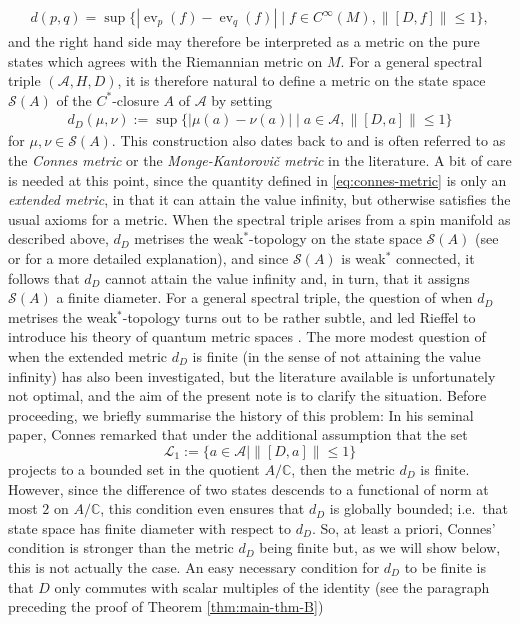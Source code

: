 \documentclass[12pt,a4paper,twoside,reqno]{amsart}
\theoremstyle{plain}
\theoremstyle{definition}
\theoremstyle{remark} %
\theoremstyle{plain}
\numberwithin{equation}{section}
\newcommand{\ev}{{\operatorname{ev}}}
\renewcommand{\leq}{\leqslant}
\newcommand{\C}[1]{\mathcal{#1}}
\newcommand{\A}{{\mathcal{A}}}
\renewcommand{\S}{{\mathcal{S}}}
\begin{document}
\begin{align*}
d(p,q)=\sup\big\{ |\ev_p(f)-\ev_q(f)| \mid f\in C^\infty(M),  \|[D,f]\| \leq 1  \big\},
\end{align*}
and the right hand side may therefore be interpreted as a metric on the pure states which agrees with the Riemannian metric on $M$.
For a general spectral triple $(\A, H, D)$, it is therefore natural to define a metric on the state space $\S (A)$ of the $C^*$-closure $A$ of $\A$ by setting
\begin{align}\label{eq:connes-metric}
d_D(\mu, \nu):=\sup\big\{|\mu(a)-\nu(a)| \mid a\in \A, \|[D,a]\|\leq 1 \big\}
\end{align}
for $\mu, \nu\in \S (A)$.
This construction also dates back to  \cite{Con:CFH} and is often referred to as the \emph{Connes metric} or the \emph{Monge-Kantorovi\v{c} metric} \cite{KaRu:FSE, KaRu:OSC} in the literature.
A bit of care is needed at this point, since the quantity defined in \eqref{eq:connes-metric} is only an \emph{extended metric}, in that it can attain the value infinity, but otherwise satisfies the usual axioms for a metric. When the spectral triple arises from a  spin manifold as described above, $d_D$ metrises the weak$^*$-topology on the state space $\S (A)$ (see \cite{Con:CFH} or \cite[Proposition 8.1]{KK:DCQ} for a  more detailed explanation), and since $\S (A)$ is weak$^*$ connected, it follows that $d_D$   cannot attain the value infinity and, in turn, that it assigns $\S (A)$ a finite diameter.
For a general spectral triple, the question of when $d_D$ metrises the weak$^*$-topology turns out to be rather subtle, and led Rieffel to introduce his theory of quantum metric spaces \cite{Rie:GHD, Rie:MSS, Rie:CQM, Lat:QGH, Lat:GPS}.  
The more modest question of when the extended metric $d_D$ is finite (in the sense of not attaining the value infinity) has also been investigated, but the literature available is unfortunately not optimal, and the aim of the present note is to clarify the situation.  Before proceeding, we briefly summarise the history of this problem:  In his seminal paper, Connes remarked  \cite[Proposition 4]{Con:CFH} that under the additional assumption that the set
\[
\C L_1:=\{a\in \A \mid  \|[D,a]\|\leq 1\}
\]
projects to a  bounded set in the quotient $A/\mathbb{C}$, then the metric $d_D$ is finite. However,  since the difference of two states descends to a functional of norm at most $2$ on $A/\mathbb{C}$, this condition even ensures that   $d_D$ is globally bounded; i.e.~that state space has finite diameter with respect to $d_D$. So, at least a priori, Connes' condition is stronger than the metric $d_D$ being finite but, as we will show below, this is not actually the case.  An easy necessary condition for $d_D$ to be finite is that $D$ only commutes with scalar multiples of the identity  (see the paragraph preceding the proof of Theorem \ref{thm:main-thm-B})
\end{document}
